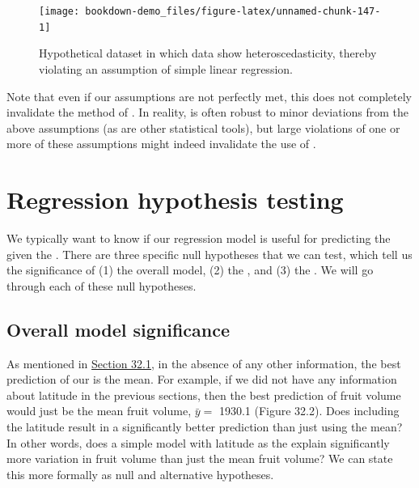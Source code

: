 \documentclass[
  openany]{krantz}
\begin{document}
\begin{figure}
\texttt{[image: bookdown-demo\_files/figure-latex/unnamed-chunk-147-1]} \caption{Hypothetical dataset in which data show heteroscedasticity, thereby violating an assumption of simple linear regression.}\label{fig:unnamed-chunk-147}
\end{figure}

Note that even if our assumptions are not perfectly met, this does not completely invalidate the method of .
In reality,  is often robust to minor deviations from the above assumptions (as are other statistical tools), but large violations of one or more of these assumptions might indeed invalidate the use of .

\hypertarget{regression-hypothesis-testing}{%
\section{Regression hypothesis testing}\label{regression-hypothesis-testing}}

We typically want to know if our regression model is useful for predicting the  given the .
There are three specific null hypotheses that we can test, which tell us the significance of (1) the overall model, (2) the , and (3) the .
We will go through each of these null hypotheses.

\hypertarget{overall-model-significance}{%
\subsection{Overall model significance}\label{overall-model-significance}}

As mentioned in \protect\hyperlink{visual-interpretation-of-regression}{Section 32.1}, in the absence of any other information, the best prediction of our  is the mean.
For example, if we did not have any information about latitude in the previous sections, then the best prediction of fruit volume would just be the mean fruit volume, \(\bar{y} =\) 1930.1 (Figure 32.2).
Does including the  latitude result in a significantly better prediction than just using the mean?
In other words, does a simple  model with latitude as the  explain significantly more variation in fruit volume than just the mean fruit volume?
We can state this more formally as null and alternative hypotheses.
\end{document}
